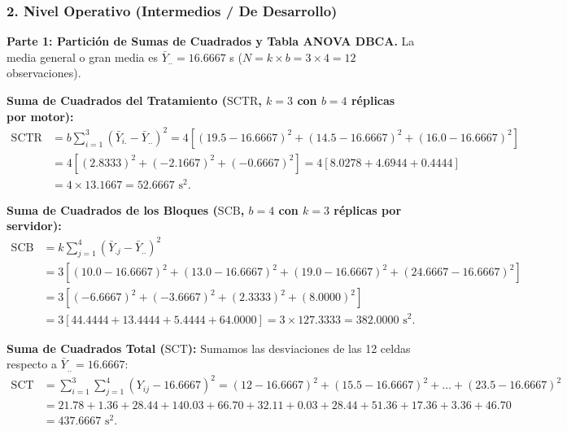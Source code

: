 \subsubsection*{2. Nivel Operativo (Intermedios / De Desarrollo)}

\begin{solproblema}
	\textbf{Parte 1: Partición de Sumas de Cuadrados y Tabla ANOVA DBCA.}
	La media general o gran media es $\bar{Y}_{..} = 16.6667$ s ($N = k \times b = 3 \times 4 = 12$ observaciones).
	
	\textbf{Suma de Cuadrados del Tratamiento ($\text{SCTR}$, $k=3$ con $b=4$ réplicas por motor):}
	\begin{align}
		\text{SCTR} &= b \sum_{i=1}^3 (\bar{Y}_{i.} - \bar{Y}_{..})^2 = 4 \left[ (19.5 - 16.6667)^2 + (14.5 - 16.6667)^2 + (16.0 - 16.6667)^2 \right] \nonumber \\
		&= 4 \left[ (2.8333)^2 + (-2.1667)^2 + (-0.6667)^2 \right] = 4 \left[ 8.0278 + 4.6944 + 0.4444 \right] \nonumber \\
		&= 4 \times 13.1667 = 52.6667 \text{ s}^2.
	\end{align}
	
	\textbf{Suma de Cuadrados de los Bloques ($\text{SCB}$, $b=4$ con $k=3$ réplicas por servidor):}
	\begin{align}
		\text{SCB} &= k \sum_{j=1}^4 (\bar{Y}_{.j} - \bar{Y}_{..})^2 \nonumber \\
		&= 3 \left[ (10.0 - 16.6667)^2 + (13.0 - 16.6667)^2 + (19.0 - 16.6667)^2 + (24.6667 - 16.6667)^2 \right] \nonumber \\
		&= 3 \left[ (-6.6667)^2 + (-3.6667)^2 + (2.3333)^2 + (8.0000)^2 \right] \nonumber \\
		&= 3 \left[ 44.4444 + 13.4444 + 5.4444 + 64.0000 \right] = 3 \times 127.3333 = 382.0000 \text{ s}^2.
	\end{align}
	
	\textbf{Suma de Cuadrados Total ($\text{SCT}$):} Sumamos las desviaciones de las 12 celdas respecto a $\bar{Y}_{..} = 16.6667$:
	\begin{align}
		\text{SCT} &= \sum_{i=1}^3 \sum_{j=1}^4 (Y_{ij} - 16.6667)^2 = (12-16.6667)^2 + (15.5-16.6667)^2 + \ldots + (23.5-16.6667)^2 \nonumber \\
		&= 21.78 + 1.36 + 28.44 + 140.03 + 66.70 + 32.11 + 0.03 + 28.44 + 51.36 + 17.36 + 3.36 + 46.70 \nonumber \\
		&= 437.6667 \text{ s}^2.
	\end{align}
	

\end{solproblema}
